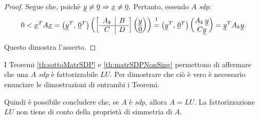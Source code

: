 \begin{proof}
    Segue che, poichè $\uline y\neq\uline 0\Rightarrow\uline x\neq\uline 0.$ Pertanto, essendo $A$ \textit{sdp}:
    \begin{equation*}
        0<\uline x^T A\uline x=\left(\uline y^T,\, \uline 0^T\right)\left(\left[\begin{array}{c|c}
            A_k & B\\
            \hline
            C & D
        \end{array}\right]\begin{pmatrix}
            \uline y\\
            \uline 0
        \end{pmatrix}\right) \overset{\footnotemark}{=}\left(\uline y^T,\,\uline 0^T\right) \begin{pmatrix}
            A_k\, \uline y\\
            C\uline y
        \end{pmatrix}=\uline y^T A_k \uline y.
    \end{equation*}

    Questo dimostra l'asserto.
\end{proof}

\addtocounter{footnote}{-1}


\begin{remark}
    I Teoremi \ref{th:sottoMatrSDP} e \ref{th:matrSDPNonSing} permettono di affermare che una $A$ \textit{sdp} è fattorizzabile $LU$. Per dimostrare che ciò è vero è necessario enunciare le dimostrazioni di entrambi i Teoremi.
\end{remark}

Quindi è possibile concludere che, se $A$ è \textit{sdp}, allora $A=LU$. La fattorizzazione $LU$ non tiene di conto della proprietà di simmetria di $A$.

